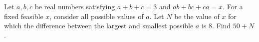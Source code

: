 Let $a,b,c$ be real numbers satisfying $a+b+c=3$ and $ab+bc+ca=x$. For a fixed feasible $x$, consider all possible values of $a$. Let $N$ be the value of $x$ for which the difference between the largest and smallest possible $a$ is $8$. Find $50+N$.
